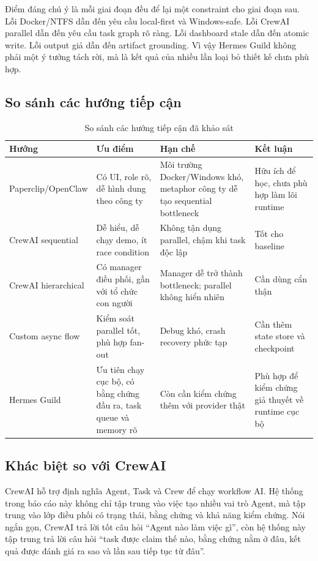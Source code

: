 \documentclass[12pt,a4paper]{article}
\begin{document}
Điểm đáng chú ý là mỗi giai đoạn đều để lại một constraint cho giai đoạn sau. Lỗi Docker/NTFS dẫn đến yêu cầu local-first và Windows-safe. Lỗi CrewAI parallel dẫn đến yêu cầu task graph rõ ràng. Lỗi dashboard stale dẫn đến atomic write. Lỗi output giả dẫn đến artifact grounding. Vì vậy Hermes Guild không phải một ý tưởng tách rời, mà là kết quả của nhiều lần loại bỏ thiết kế chưa phù hợp.

\subsection{So sánh các hướng tiếp cận}

\begin{table}[H]
\centering
\caption{So sánh các hướng tiếp cận đã khảo sát}
\begin{tabular}{p{}p{}p{}p{}}
\toprule
\textbf{Hướng} & \textbf{Ưu điểm} & \textbf{Hạn chế} & \textbf{Kết luận} \\
\midrule
Paperclip/OpenClaw & Có UI, role rõ, dễ hình dung theo công ty & Môi trường Docker/Windows khó, metaphor công ty dễ tạo sequential bottleneck & Hữu ích để học, chưa phù hợp làm lõi runtime \\
CrewAI sequential & Dễ hiểu, dễ chạy demo, ít race condition & Không tận dụng parallel, chậm khi task độc lập & Tốt cho baseline \\
CrewAI hierarchical & Có manager điều phối, gần với tổ chức con người & Manager dễ trở thành bottleneck; parallel không hiển nhiên & Cần dùng cẩn thận \\
Custom async flow & Kiểm soát parallel tốt, phù hợp fan-out & Debug khó, crash recovery phức tạp & Cần thêm state store và checkpoint \\
Hermes Guild & Ưu tiên chạy cục bộ, có bằng chứng đầu ra, task queue và memory rõ & Còn cần kiểm chứng thêm với provider thật & Phù hợp để kiểm chứng giả thuyết về runtime cục bộ \\
\bottomrule
\end{tabular}
\end{table}

\subsection{Khác biệt so với CrewAI}

CrewAI hỗ trợ định nghĩa Agent, Task và Crew để chạy workflow AI. Hệ thống trong báo cáo này không chỉ tập trung vào việc tạo nhiều vai trò Agent, mà tập trung vào lớp điều phối có trạng thái, bằng chứng và khả năng kiểm chứng. Nói ngắn gọn, CrewAI trả lời tốt câu hỏi ``Agent nào làm việc gì'', còn hệ thống này tập trung trả lời câu hỏi ``task được claim thế nào, bằng chứng nằm ở đâu, kết quả được đánh giá ra sao và lần sau tiếp tục từ đâu''.
\end{document}
